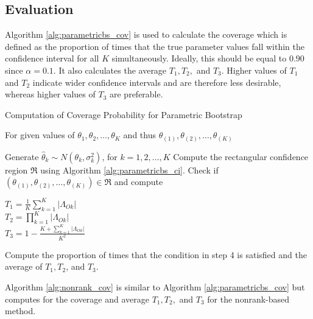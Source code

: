 \documentclass[
  12pt,
  a4paper,
]{article}
\numberwithin{equation}{section}
\begin{document}
\subsection{Evaluation}\label{sec:evaluation}

Algorithm \ref{alg:parametricbs_cov} is used to calculate the coverage which is defined as the proportion of times that the true parameter values fall within the confidence interval for all \(K\) simultaneously. Ideally, this should be equal to \(0.90\) since \(\alpha = 0.1\). It also calculates the average \(T_1, T_2,\) and \(T_3\). Higher values of \(T_1\) and \(T_2\) indicate wider confidence intervals and are therefore less desirable, whereas higher values of \(T_3\) are preferable.

\begin{algorithm}[H]
    \caption{Computation of Coverage Probability for Parametric Bootstrap} 
    \label{alg:parametricbs_cov}
    For given values of $\theta_1, \theta_2, \dots, \theta_K$ and thus $\theta_{(1)}, \theta_{(2)}, \dots, \theta_{(K)}$
    \begin{algorithmic}[1] %
            \State Generate $\hat\theta_k \sim N(\theta_k, \sigma^2_k)$, for $k = 1, 2, \dots, K$
            \State Compute the rectangular confidence region $\mathfrak{R}$ using Algorithm \ref{alg:parametricbs_ci}.
            \State Check if $\left( \theta_{(1)}, \theta_{(2)}, \dots, \theta_{(K)}\right) \in \mathfrak{R}$ and compute 
            \Statex \begin{minipage}{\linewidth}
        \centering
            $T_1 = \frac{1}{K} \sum^K_{k=1} \Big | \Lambda_{Ok} \Big|$\\
            $T_2 = \prod^K_{k=1} \Big | \Lambda_{Ok} \Big|$\\
            $T_3 = 1 - \frac{K + \sum^K_{k=1} \big | \Lambda_{Ok} \big|}{K^2}$\\
            \end{minipage}
        \EndFor
    \State Compute the proportion of times that the condition in step 4 is satisfied and the average of $T_1, T_2$, and $T_3$.
    \end{algorithmic} %
\end{algorithm}

Algorithm \ref{alg:nonrank_cov} is similar to Algorithm \ref{alg:parametricbs_cov} but computes for the coverage and average \(T_1, T_2,\) and \(T_3\) for the nonrank-based method.
\end{document}
